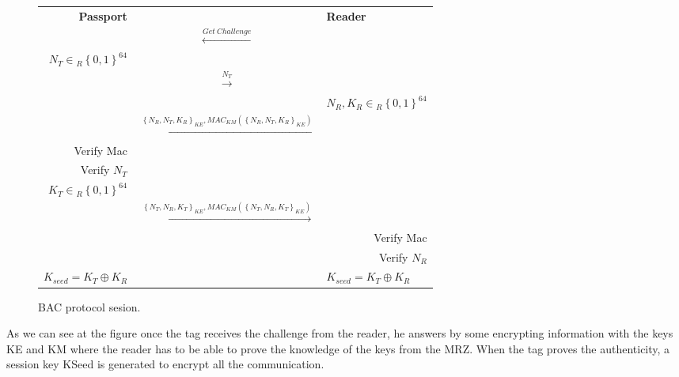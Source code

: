 \documentclass{acm_proc_article-sp}
\begin{document}

\begin{figure*}[t]
  \centering
	\begin{tabular}{p{3.8cm}cp{4.5cm}}
		\multicolumn{1}{r}{\textbf{Passport}} & &
        \multicolumn{1}{l}{\textbf{Reader}}\\ 	
        &$\xleftarrow{ Get\ Challenge }$& \\
		\multicolumn{1}{r}{$N_T \in{_R \left\{{0,1}\right\}}^{64}$} & & \\               
		&$\xrightarrow{ N_T }$& \\
		
        &&\multicolumn{1}{l}{$N_R,K_R \in{_R \left\{{0,1}\right\}}^{64}$}\\ 
		&$\xleftarrow{\left\{{N_R,N_T,K_R}\right\}_{KE},MAC_{KM}(\left\{{N_R,N_T,K_R}\right\}_{KE})}$& \\
		\multicolumn{1}{r}{Verify Mac} & & \\
		\multicolumn{1}{r}{Verify $N_T$} & & \\				
		\multicolumn{1}{r}{$K_T \in{_R \left\{{0,1}\right\}}^{64}$} & & \\               		
		&$\xrightarrow{\left\{{N_T,N_R,K_T}\right\}_{KE},MAC_{KM}(\left\{{N_T,N_R,K_T}\right\}_{KE})}$& \\
		&&\multicolumn{1}{r}{Verify Mac}\\
		&&\multicolumn{1}{r}{Verify $N_R$}\\
		\multicolumn{1}{r}{$K_{seed} = K_T\oplus{}K_R $} & &
        \multicolumn{1}{l}{$K_{seed} = K_T\oplus{}K_R $}\\		
	\end{tabular}
  \caption{BAC protocol sesion.}
  \label{fig:fig1}
\end{figure*}


As we can see at the figure 
once the tag receives the challenge from the reader, he answers 
by some encrypting information with the keys KE and KM where the reader has to be able to prove the 
knowledge of the keys from the MRZ. When the tag proves the authenticity, a session key KSeed 
is generated to encrypt all the communication.
\end{document}
